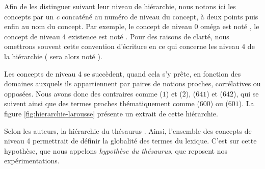 Afin de les distinguer suivant leur niveau de hiérarchie, nous notons
ici les concepts par un \emph{c} concaténé au numéro de niveau du
concept, à deux points puis enfin au nom du concept. Par exemple, le
concept de niveau 0 oméga est noté , le concept de
niveau 4 existence est noté . Pour des raisons de
clarté, nous omettrons souvent cette convention d'écriture en ce qui
concerne les niveau 4 de la hiérarchie ( sera
alors noté ).

Les concepts de niveau 4 se succèdent, quand cela s'y prête, en
fonction des domaines auxquels ils appartiennent par paires de notions
proches, corrélatives ou opposées. Nous avons donc des contraires
comme  ($1$) et  ($2$),
 ($641$) et  ($642$), qui se suivent
ainsi que des termes proches thématiquement comme 
($600$) ou  ($601$).
La figure \ref{fig:hierarchie-larousse} présente un extrait de cette
hiérarchie.


Selon les auteurs, la hiérarchie du thésaurus .  Ainsi, l'ensemble des concepts de niveau 4 permettrait de
définir la globalité des termes du lexique. C'est sur cette hypothèse,
que nous appelons \emph{hypothèse du thésaurus}, que reposent nos
expérimentations.

